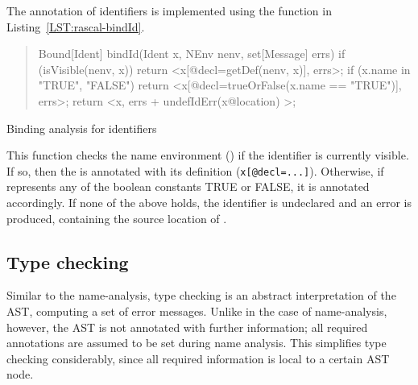 The annotation of identifiers is implemented using the
function in Listing~\ref{LST:rascal-bindId}.
\begin{listing}
\begin{quote}\small
\begin{rascal}
Bound[Ident] bindId(Ident x, NEnv nenv, set[Message] errs) {
  if (isVisible(nenv, x))
    return <x[@decl=getDef(nenv, x)], errs>;  
  if (x.name in {"TRUE", "FALSE"})
    return <x[@decl=trueOrFalse(x.name == "TRUE")], errs>;
  return <x, errs + { undefIdErr(x@location) }>;
}
\end{rascal}
\end{quote}
\caption{Binding analysis for identifiers}
\label{LST:rascal-bindId}
\end{listing}
This function checks the name environment () if the
identifier  is currently visible. If so, then the
 is annotated with its definition
(\texttt{x[@decl=...]}). Otherwise, if  represents any of the
boolean constants TRUE or FALSE, it is annotated accordingly. If none
of the above holds, the identifier is undeclared and an error is
produced, containing the source location of .

\subsection{Type checking}

\noindent Similar to the name-analysis, type checking is an abstract
interpretation of the AST, computing a set of error messages. Unlike
in the case of name-analysis, however, the AST is not annotated with
further information; all required annotations are assumed to be set
during name analysis. This simplifies type checking considerably,
since all required information is local to a certain AST node.

